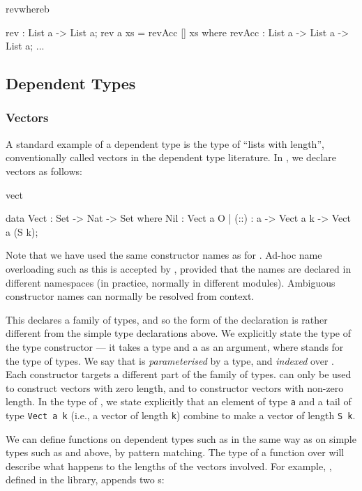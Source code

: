 \begin{SaveVerbatim}{revwhereb}

rev : List a -> List a;
rev {a} xs = revAcc [] xs where {
  revAcc : List a -> List a -> List a;
  ...
}

\end{SaveVerbatim}

\subsection{Dependent Types}

\subsubsection{Vectors}

A standard example of a dependent type is the type of ``lists with length'',
conventionally called vectors in the dependent type literature. In \Idris{},
we declare vectors as follows:

\begin{SaveVerbatim}{vect}

data Vect : Set -> Nat -> Set where
   Nil  : Vect a O
 | (::) : a -> Vect a k -> Vect a (S k);

\end{SaveVerbatim}

Note that we have used the same constructor names as for . Ad-hoc
name overloading such as this is accepted by \Idris{}, provided that the names
are declared in different namespaces (in practice, normally in different modules).
Ambiguous constructor names can normally be resolved from context.

This declares a family of types, and so the form of the declaration is rather
different from the simple type declarations above. We explicitly state the type
of the type constructor  --- it takes a type and a  as an
argument, where  stands for the type of types. We say that 
is \emph{parameterised} by a type, and \emph{indexed} over . Each
constructor targets a different part of the family of types.  can only
be used to construct vectors with zero length, and \tDC{::} to constructor
vectors with non-zero length. In the type of \tDC{::}, we state explicitly that an element
of type \texttt{a} and a tail of type \texttt{Vect a k} (i.e., a vector of length \texttt{k})
combine to make a vector of length \texttt{S k}.

We can define functions on dependent types such as  in the same way
as on simple types such as  and  above, by pattern matching.
The type of a function over  will describe what happens to the
lengths of the vectors involved. For example, , defined in the
library, appends two s:

